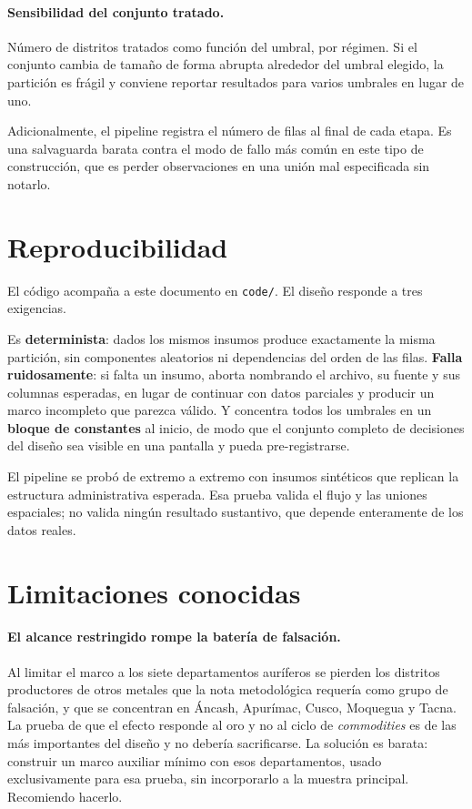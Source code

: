 \documentclass[11pt,a4paper]{article}
\begin{document}
\paragraph{Sensibilidad del conjunto tratado.} Número de distritos tratados como función del umbral, por régimen. Si el conjunto cambia de tamaño de forma abrupta alrededor del umbral elegido, la partición es frágil y conviene reportar resultados para varios umbrales en lugar de uno.

Adicionalmente, el pipeline registra el número de filas al final de cada etapa. Es una salvaguarda barata contra el modo de fallo más común en este tipo de construcción, que es perder observaciones en una unión mal especificada sin notarlo.

\section{Reproducibilidad}

El código acompaña a este documento en \texttt{code/}. El diseño responde a tres exigencias.

Es \textbf{determinista}: dados los mismos insumos produce exactamente la misma partición, sin componentes aleatorios ni dependencias del orden de las filas. \textbf{Falla ruidosamente}: si falta un insumo, aborta nombrando el archivo, su fuente y sus columnas esperadas, en lugar de continuar con datos parciales y producir un marco incompleto que parezca válido. Y concentra todos los umbrales en un \textbf{bloque de constantes} al inicio, de modo que el conjunto completo de decisiones del diseño sea visible en una pantalla y pueda pre-registrarse.

El pipeline se probó de extremo a extremo con insumos sintéticos que replican la estructura administrativa esperada. Esa prueba valida el flujo y las uniones espaciales; no valida ningún resultado sustantivo, que depende enteramente de los datos reales.

\section{Limitaciones conocidas}\label{sec:limitaciones}

\paragraph{El alcance restringido rompe la batería de falsación.} Al limitar el marco a los siete departamentos auríferos se pierden los distritos productores de otros metales que la nota metodológica requería como grupo de falsación, y que se concentran en Áncash, Apurímac, Cusco, Moquegua y Tacna. La prueba de que el efecto responde al oro y no al ciclo de \emph{commodities} es de las más importantes del diseño y no debería sacrificarse. La solución es barata: construir un marco auxiliar mínimo con esos departamentos, usado exclusivamente para esa prueba, sin incorporarlo a la muestra principal. Recomiendo hacerlo.
\end{document}
